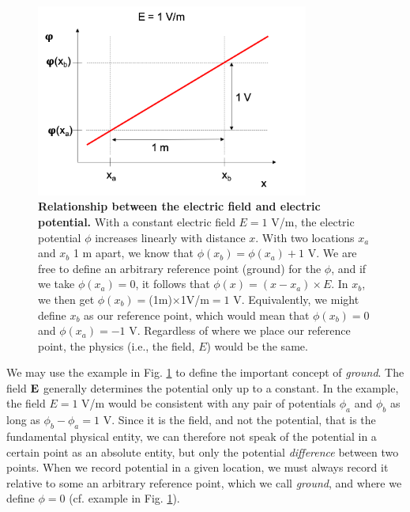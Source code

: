 \begin{figure}[!ht]
\begin{center}
\includegraphics[width=0.8\textwidth]{Figures/Basics/Ground.png}
\end{center}
\caption{\textbf{Relationship between the electric field and electric potential.} With a constant electric field $E = 1$ V/m, the electric potential $\phi$ increases linearly with distance $x$. With two locations $x_a$ and $x_b$ 1 m apart, we know that $\phi(x_b) = \phi(x_a) + 1$ V. We are free to define an arbitrary reference point (ground) for the $\phi$, and if we take $\phi(x_a) = 0$, it follows that $\phi(x) = (x-x_a) \times E$. In $x_b$, we then get $\phi(x_b)=$(1m)$\times$1V/m$=1$ V. Equivalently, we might define $x_b$ as our reference point, which would mean that $\phi(x_b) = 0$ and $\phi(x_a) = -1$ V. Regardless of where we place our reference point, the physics (i.e., the field, $E$) would be the same.
}
\label{fig:Basics:Ground}
\end{figure}

We may use the example in Fig. \ref{fig:Basics:Ground} to define the important concept of \textit{ground}. The field ${\bf E}$ generally determines the potential only up to a constant. In the example, the field $E = 1$ V/m would be consistent with any pair of potentials $\phi_a$ and $\phi_b$ as long as $\phi_b - \phi_a =  1$ V. Since it is the field, and not the potential, that is the fundamental physical entity, we can therefore not speak of the potential in a certain point as an absolute entity, but only the potential \textit{difference} between two points. When we record potential in a given location, we must always record it relative to some an arbitrary reference point, which we call \textit{ground}, and where we define $\phi = 0$ (cf. example in Fig. \ref{fig:Basics:Ground}). 

